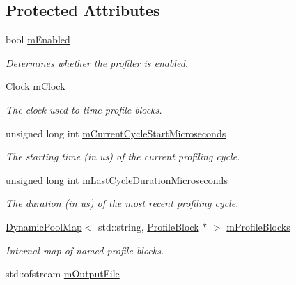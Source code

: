 \subsection*{Protected Attributes}
\begin{CompactItemize}
\item 
bool \hyperlink{class_j_g_t_l_1_1_profiler_3eb8fff02ac8b0a76273ee80486ec7cc}{m\-Enabled}
\begin{CompactList}\small\item\em Determines whether the profiler is enabled. \item\end{CompactList}\item 
\hyperlink{class_j_g_t_l_1_1_clock}{Clock} \hyperlink{class_j_g_t_l_1_1_profiler_a3e9ba84db33b2174fe49fc1d7b4939e}{m\-Clock}
\begin{CompactList}\small\item\em The clock used to time profile blocks. \item\end{CompactList}\item 
unsigned long int \hyperlink{class_j_g_t_l_1_1_profiler_c68abd2b4577f814f6f42e1f7a91cc88}{m\-Current\-Cycle\-Start\-Microseconds}
\begin{CompactList}\small\item\em The starting time (in us) of the current profiling cycle. \item\end{CompactList}\item 
unsigned long int \hyperlink{class_j_g_t_l_1_1_profiler_e6bcfdec9aa0d82a91c3c5b7f4338613}{m\-Last\-Cycle\-Duration\-Microseconds}
\begin{CompactList}\small\item\em The duration (in us) of the most recent profiling cycle. \item\end{CompactList}\item 
\hyperlink{class_j_g_t_l_1_1_dynamic_pool_map}{Dynamic\-Pool\-Map}$<$ std::string, \hyperlink{struct_j_g_t_l_1_1_profile_block}{Profile\-Block} $\ast$ $>$ \hyperlink{class_j_g_t_l_1_1_profiler_7ac2afca08882c6e136cf31d614e1617}{m\-Profile\-Blocks}
\begin{CompactList}\small\item\em Internal map of named profile blocks. \item\end{CompactList}\item 
std::ofstream \hyperlink{class_j_g_t_l_1_1_profiler_23216cd9e785ee8617fbe6d6c15008f0}{m\-Output\-File}

\end{CompactItemize}
